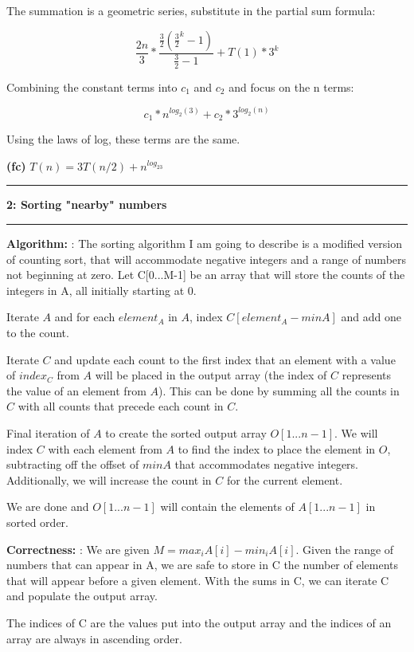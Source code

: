 \documentclass[11pt]{article}
\newcommand\question[2]{\vspace{.25in}\hrule\textbf{#1: #2}\vspace{.5em}\hrule\vspace{.10in}}
\renewcommand\part[1]{\vspace{.10in}\textbf{(#1)}}
\newcommand\algorith{\vspace{.10in}\textbf{Algorithm: }}
\newcommand\correctness{\vspace{.10in}\textbf{Correctness: }}
\begin{document}
The summation is a geometric series, substitute in the partial sum formula:

$$\frac{2n}{3} * \frac{\frac{3}{2}(\frac{3}{2}^k -1)}{\frac{3}{2} - 1} + T(1) * 3^k$$

Combining the constant terms into $c_1$ and $c_2$ and focus on the n terms:

$$c_1 * n^{log_2(3)} + c_2 * 3^{log_2(n)}$$

Using the laws of log, these terms are the same.


\part{fc} $T(n) = 3T(n/2) + n^{log_23}$

\question{2}{Sorting "nearby" numbers} 

\algorith: The sorting algorithm I am going to describe is a modified version of counting sort, that will accommodate negative integers and a range of numbers not beginning at zero. Let C[0...M-1] be an array that will store the counts of the integers in A, all initially starting at 0. 

Iterate $A$ and for each $element_A$ in $A$, index $C[element_A - minA]$ and add one to the count. 

Iterate $C$ and update each count to the first index that an element with a value of $index_C$ from $A$ will be placed in the output array (the index of $C$ represents the value of an element from $A$). This can be done by summing all the counts in $C$ with all counts that precede each count in $C$.

Final iteration of $A$ to create the sorted output array $O[1...n-1]$. We will index $C$ with each element from $A$ to find the index to place the element in $O$, subtracting off the offset of $minA$ that accommodates negative integers. Additionally, we will increase the count in $C$ for the current element. 

We are done and $O[1...n-1]$ will contain the elements of $A[1...n-1]$ in sorted order.

\correctness: We are given $M = max_iA[i] - min_iA[i]$. Given the range of numbers that can appear in A, we are safe to store in C the number of elements that will appear before a given element. With the sums in C, we can iterate C and populate the output array. 

	The indices of C are the values put into the output array and the indices of an array are always in ascending order. 
	
\end{document}
